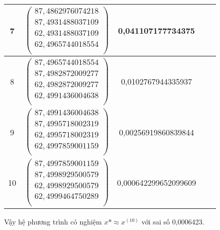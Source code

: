 \begin{center}
\begin{tabular}{|c|c|c|c|c|}
7&$\begin{pmatrix}87,4862976074218\\87,4931488037109\\62,4931488037109\\62,4965744018554\\\end{pmatrix}$&0,041107177734375\\\hline
8&$\begin{pmatrix}87,4965744018554\\87,4982872009277\\62,4982872009277\\62,4991436004638\\\end{pmatrix}$&0,0102767944335937\\\hline
9&$\begin{pmatrix}87,4991436004638\\87,4995718002319\\62,4995718002319\\62,4997859001159\\\end{pmatrix}$&0,00256919860839844\\\hline
10&$\begin{pmatrix}87,4997859001159\\87,4998929500579\\62,4998929500579\\62,4999464750289\\\end{pmatrix}$&0,000642299652099609\\\hline
\end{tabular}
\end{center}
Vậy hệ phương trình có nghiệm $x*\approx x^{(10)}$ với sai số 0,0006423.
